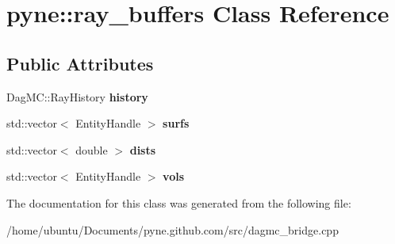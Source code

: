 \hypertarget{classpyne_1_1ray__buffers}{}\section{pyne\+:\+:ray\+\_\+buffers Class Reference}
\label{classpyne_1_1ray__buffers}
\subsection*{Public Attributes}
\begin{DoxyCompactItemize}
\item 
Dag\+M\+C\+::\+Ray\+History {\bfseries history}\hypertarget{classpyne_1_1ray__buffers_adb3331dbf290b1c6d44c37931a917a7e}{}\label{classpyne_1_1ray__buffers_adb3331dbf290b1c6d44c37931a917a7e}

\item 
std\+::vector$<$ Entity\+Handle $>$ {\bfseries surfs}\hypertarget{classpyne_1_1ray__buffers_ac2a784c86703f7253861ceaa73ba5e6b}{}\label{classpyne_1_1ray__buffers_ac2a784c86703f7253861ceaa73ba5e6b}

\item 
std\+::vector$<$ double $>$ {\bfseries dists}\hypertarget{classpyne_1_1ray__buffers_a2904cd95dd5c1cb04ca796cf025bced1}{}\label{classpyne_1_1ray__buffers_a2904cd95dd5c1cb04ca796cf025bced1}

\item 
std\+::vector$<$ Entity\+Handle $>$ {\bfseries vols}\hypertarget{classpyne_1_1ray__buffers_a2d059fcf9432e03b28eade60308b2498}{}\label{classpyne_1_1ray__buffers_a2d059fcf9432e03b28eade60308b2498}

\end{DoxyCompactItemize}


The documentation for this class was generated from the following file\+:\begin{DoxyCompactItemize}
\item 
/home/ubuntu/\+Documents/pyne.\+github.\+com/src/dagmc\+\_\+bridge.\+cpp\end{DoxyCompactItemize}
